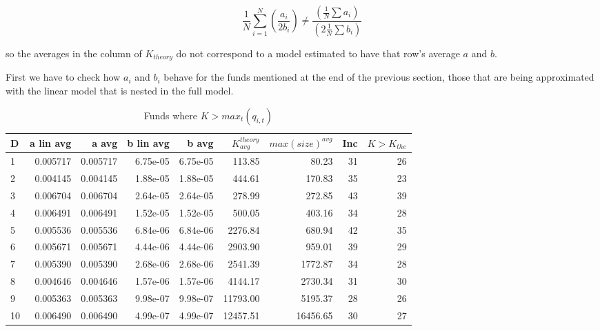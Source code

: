 \documentclass[12pt]{article}
\begin{document}
$$ \frac{1}{N} \sum_{i=1}^{N} \left( \frac{a_i}{2b_i} \right) \neq \frac{\left( \frac{1}{N} \sum a_i \right)}{\left( 2\frac{1}{N} \sum b_i \right)} $$

so the averages in the column of $K_{theory}$ do not correspond to a model estimated to have that row's average $a$ and $b$.

\par First we have to check how $a_i$ and $b_i$ behave for the funds mentioned at the end of the previous section, those that are being approximated with the linear model that is nested in the full model.

\begin{table}[H]
    \centering
    \caption{Funds where $K>max_t(q_{i,t})$}
    \label{k>max-alin-bln-a-b}
    \begin{tabular}{lrrrrrrrr}
        \hline
        D & a lin avg & a avg & b lin avg & b avg & $K^{theory}_{avg}$  & $max(size)^{avg}$ & Inc & $K>K_{the}$ \\
        \hline
        1 & 0.005717 & 0.005717 & 6.75e-05 & 6.75e-05 & 113.85 & 80.23 & 31 & 26 \\
        2 & 0.004145 & 0.004145 & 1.88e-05 & 1.88e-05 & 444.61 & 170.83 & 35 & 23 \\
        3 & 0.006704 & 0.006704 & 2.64e-05 & 2.64e-05 & 278.99 & 272.85 & 43 & 39 \\
        4 & 0.006491 & 0.006491 & 1.52e-05 & 1.52e-05 & 500.05 & 403.16 & 34 & 28 \\
        5 & 0.005536 & 0.005536 & 6.84e-06 & 6.84e-06 & 2276.84 & 680.94 & 42 & 35 \\
        6 & 0.005671 & 0.005671 & 4.44e-06 & 4.44e-06 & 2903.90 & 959.01 & 39 & 29 \\
        7 & 0.005390 & 0.005390 & 2.68e-06 & 2.68e-06 & 2541.39 & 1772.87 & 34 & 28 \\
        8 & 0.004646 & 0.004646 & 1.57e-06 & 1.57e-06 & 4144.17 & 2730.34 & 31 & 30 \\
        9 & 0.005363 & 0.005363 & 9.98e-07 & 9.98e-07 & 11793.00 & 5195.37 & 28 & 26 \\
        10 & 0.006490 & 0.006490 & 4.99e-07 & 4.99e-07 & 12457.51 & 16456.65 & 30 & 27 \\
        \hline
    \end{tabular}
\end{table}
\end{document}
